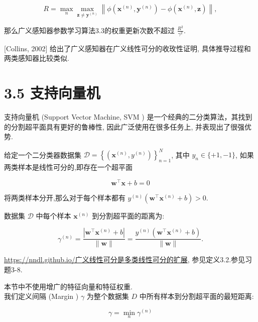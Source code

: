 \documentclass[10pt]{article}
\begin{document}
\begin{equation*}
R=\max _{n} \max _{\boldsymbol{z} \neq \boldsymbol{y}^{(n)}}\left\|\phi\left(\boldsymbol{x}^{(n)}, \boldsymbol{y}^{(n)}\right)-\phi\left(\boldsymbol{x}^{(n)}, \boldsymbol{z}\right)\right\|, \tag{3.81}
\end{equation*}


那么广义感知器参数学习算法3.3的权重更新次数不超过 $\frac{R^{2}}{\gamma^{2}}$.

[Collins, 2002] 给出了广义感知器在广义线性可分的收玫性证明, 具体推导过程和两类感知器比较类似.

\section*{3.5 支持向量机}
支持向量机 (Support Vector Machine, SVM ) 是一个经典的二分类算法，其找到的分割超平面具有更好的鲁棒性, 因此广泛使用在很多任务上, 并表现出了很强优势.

给定一个二分类器数据集 $\mathcal{D}=\left\{\left(\boldsymbol{x}^{(n)}, y^{(n)}\right)\right\}_{n=1}^{N}$, 其中 $y_{n} \in\{+1,-1\}$, 如果两类样本是线性可分的,即存在一个超平面


\begin{equation*}
\boldsymbol{w}^{\top} \boldsymbol{x}+b=0 \tag{3.82}
\end{equation*}


将两类样本分开,那么对于每个样本都有 $y^{(n)}\left(\boldsymbol{w}^{\top} \boldsymbol{x}^{(n)}+b\right)>0$.

数据集 $\mathcal{D}$ 中每个样本 $\boldsymbol{x}^{(n)}$ 到分割超平面的距离为:


\begin{equation*}
\gamma^{(n)}=\frac{\left|\boldsymbol{w}^{\top} \boldsymbol{x}^{(n)}+b\right|}{\|\boldsymbol{w}\|}=\frac{y^{(n)}\left(\boldsymbol{w}^{\top} \boldsymbol{x}^{(n)}+b\right)}{\|\boldsymbol{w}\|} . \tag{3.83}
\end{equation*}


\href{https://nndl.github.io/%E5%B9%BF%E4%B9%89%E7%BA%BF%E6%80%A7%E5%8F%AF%E5%88%86%E6%98%AF%E5%A4%9A%E7%B1%BB%E7%BA%BF%E6%80%A7%E5%8F%AF%E5%88%86%E7%9A%84%E6%89%A9%E5%B1%95}{https://nndl.github.io/广义线性可分是多类线性可分的扩展}, 参见定义3.2.参见习题3-8.

本节中不使用增广的特征向量和特征权重.\\
我们定义间隔 (Margin ) $\gamma$ 为整个数据集 $D$ 中所有样本到分割超平面的最短距离:


\begin{equation*}
\gamma=\min _{n} \gamma^{(n)} \tag{3.84}
\end{equation*}
\end{document}
